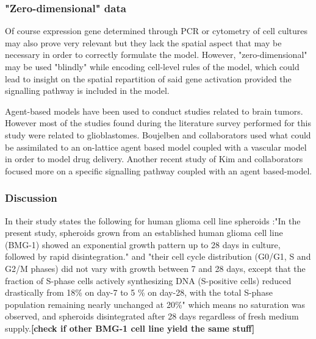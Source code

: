 \documentclass[11pt,a4paper]{article}
\begin{document}
\subsubsection{"Zero-dimensional" data}
Of course expression gene determined through PCR or cytometry of cell cultures may also prove very relevant but they lack the spatial aspect that may be necessary in order to correctly formulate the model. However, "zero-dimensional" may be used "blindly" while encoding cell-level rules of the model, which could lead to insight on the spatial repartition of said gene activation provided the signalling pathway is included in the model. 

Agent-based models have been used to conduct studies related to brain tumors. However most of the studies found during the literature survey performed for this study were related to glioblastomes. Boujelben and collaborators used what could be assimilated to an on-lattice agent based model coupled with a vascular model in order to model drug delivery.\cite{Boujelben2016} Another recent study of Kim and collaborators focused more on a specific signalling pathway coupled with an agent based-model.\cite{Kim2015}



\subsubsection{Discussion}
In their study \cite{Khaitan2006} states the following for human glioma cell line spheroids :"In the present study, spheroids grown from an established human glioma cell line (BMG-1) showed an exponential growth pattern up to 28 days in culture, followed by rapid disintegration." and "their cell cycle distribution (G0/G1, S and G2/M phases) did not vary with growth between 7 and 28 days, except that the fraction of S-phase cells actively synthesizing DNA (S-positive cells) reduced drastically from 18\% on day-7 to 5 \% on day-28, with the total S-phase population remaining nearly unchanged at 20\%"\cite{Khaitan2006} which means no saturation was observed, and spheroids disintegrated after 28 days regardless of fresh medium supply.\textbf{[check if other BMG-1 cell line yield the same stuff]}
\end{document}
